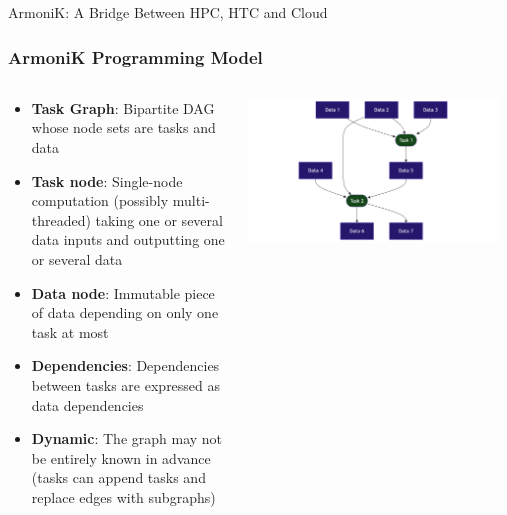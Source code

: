 \documentclass[10pt,aspectratio=1609]{beamer}
\begin{document}
\begin{section}{ArmoniK: A Bridge Between HPC, HTC and Cloud}
  \begin{frame}
    \frametitle{ArmoniK Programming Model}
    \begin{columns}[T]
      \begin{column}{0.5\textwidth}
        \begin{itemize}
          \item \textbf{Task Graph}: Bipartite DAG whose node sets are tasks and data
          \item \textbf{Task node}: Single-node computation (possibly multi-threaded) taking one or several data inputs and outputting one or several data
          \item \textbf{Data node}: Immutable piece of data depending on only one task at most
          \item \textbf{Dependencies}: Dependencies between tasks are expressed as data dependencies
          \item \textbf{Dynamic}: The graph may not be entirely known in advance (tasks can append tasks and replace edges with subgraphs)
        \end{itemize}
      \end{column}
      \begin{column}{0.5\textwidth}
        \centering
        \includegraphics[width=0.95\textwidth]{mermaid-task-graph.png}
      \end{column}
    \end{columns}
  \end{frame}


\end{section}
\end{document}

